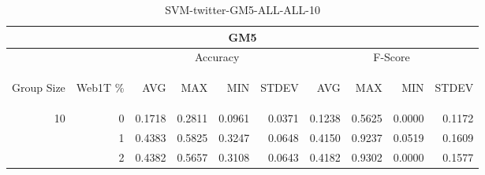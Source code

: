 \begin{center}
\begin{table}[htbp] 
 \begin{center}
\begin{tabular}{ | r | r | r | r | r | r | r | r | r | r |}
\hline
\multicolumn{10}{|c|}{GM5}\\
\hline
 & & \multicolumn{4}{|c|}{Accuracy} & \multicolumn{4}{|c|}{F-Score}\\ \cline{3-10}
\begin{sideways}Group Size\end{sideways} & \begin{sideways}Web1T \%\end{sideways} & \begin{sideways}AVG\end{sideways} & \begin{sideways}MAX\end{sideways} & \begin{sideways}MIN\end{sideways} & \begin{sideways}STDEV\end{sideways} & \begin{sideways}AVG\end{sideways} & \begin{sideways}MAX\end{sideways} & \begin{sideways}MIN\end{sideways} & \begin{sideways}STDEV\end{sideways}\\
\hline
\multirow{2}{*}{10}
 & 0 & 0.1718 & 0.2811 & 0.0961 & 0.0371 & 0.1238 & 0.5625 & 0.0000 & 0.1172\\ \cline{2-10}
 & 1 & 0.4383 & 0.5825 & 0.3247 & 0.0648 & 0.4150 & 0.9237 & 0.0519 & 0.1609\\ \cline{2-10}
 & 2 & 0.4382 & 0.5657 & 0.3108 & 0.0643 & 0.4182 & 0.9302 & 0.0000 & 0.1577\\ \cline{2-10}
\hline
\end{tabular}
\caption{SVM-twitter-GM5-ALL-ALL-10}
\label{table:SVM-twitter-GM5-ALL-ALL-10}
\end{center}
 \end{table}
\end{center}

